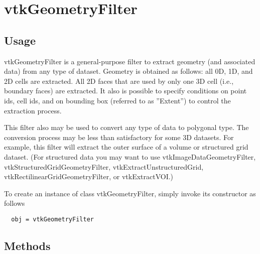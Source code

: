 \section{vtkGeometryFilter}

\subsection{Usage}

 vtkGeometryFilter is a general-purpose filter to extract geometry (and 
 associated data) from any type of dataset. Geometry is obtained as 
 follows: all 0D, 1D, and 2D cells are extracted. All 2D faces that are 
 used by only one 3D cell (i.e., boundary faces) are extracted. It also is 
 possible to specify conditions on point ids, cell ids, and on 
 bounding box (referred to as ''Extent'') to control the extraction process.

 This filter also may be used to convert any type of data to polygonal
 type. The conversion process may be less than satisfactory for some 3D
 datasets. For example, this filter will extract the outer surface of a 
 volume or structured grid dataset. (For structured data you may want to
 use vtkImageDataGeometryFilter, vtkStructuredGridGeometryFilter,
 vtkExtractUnstructuredGrid, vtkRectilinearGridGeometryFilter, or 
 vtkExtractVOI.)

To create an instance of class vtkGeometryFilter, simply
invoke its constructor as follows
\begin{verbatim}
  obj = vtkGeometryFilter
\end{verbatim}
\subsection{Methods}

